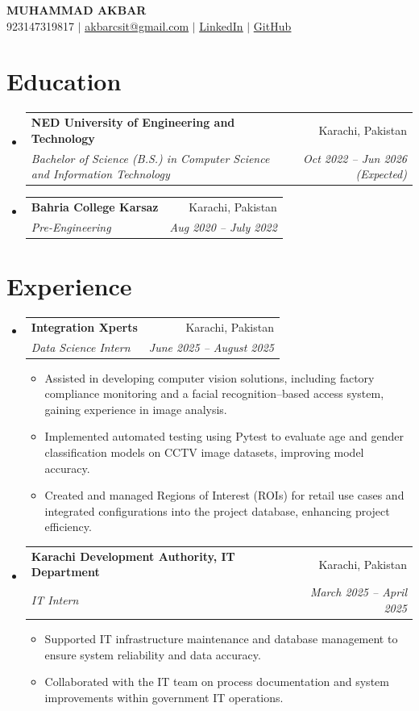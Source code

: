 \documentclass[letterpaper,11pt]{article}
\makeatletter
\newcommand{\resumeItem}[1]{
  \item\small{
    {#1 \vspace{-2pt}}
  }
}
\newcommand{\resumeSubheading}[4]{
  \vspace{-2pt}\item
    \begin{tabular*}{0.97\textwidth}[t]{l@{\extracolsep{\fill}}r}
      \textbf{#1} & #2 \\
      \textit{\small#3} & \textit{\small #4} \\
    \end{tabular*}\vspace{-7pt}
}
\newcommand{\resumeSubHeadingListStart}{\begin{itemize}[leftmargin=0.15in, label={}]}
\newcommand{\resumeSubHeadingListEnd}{\end{itemize}}
\newcommand{\resumeItemListStart}{\begin{itemize}}
\newcommand{\resumeItemListEnd}{\end{itemize}\vspace{-5pt}}
\makeatother
\begin{document}
\begin{center}
    \textbf{\Huge \scshape MUHAMMAD AKBAR} \\ \vspace{1pt}
    \small 923147319817 $|$ \href{mailto:akbarcsit@gmail.com}{\underline{akbarcsit@gmail.com}} $|$ 
    \href{https://www.linkedin.com/in/muhammad-akbar-0b7767270}{\underline{LinkedIn}} $|$
    \href{https://github.com/muakbar04}{\underline{GitHub}}
\end{center}


\section{Education}
  \resumeSubHeadingListStart
        \resumeSubheading
      {NED University of Engineering and Technology}{Karachi, Pakistan}
      {Bachelor of Science (B.S.) in Computer Science and Information Technology}{Oct 2022 – Jun 2026 (Expected)}
        \resumeSubheading
      {Bahria College Karsaz}{Karachi, Pakistan}
      {Pre-Engineering}{Aug 2020 – July 2022}
      \resumeSubHeadingListEnd


\section{Experience}
  \resumeSubHeadingListStart
        \resumeSubheading
      {Integration Xperts}{Karachi, Pakistan}
      {Data Science Intern}{June 2025 – August 2025}
      \resumeItemListStart
                \resumeItem{Assisted in developing computer vision solutions, including factory compliance monitoring and a facial recognition–based access system, gaining experience in image analysis.}
                \resumeItem{Implemented automated testing using Pytest to evaluate age and gender classification models on CCTV image datasets, improving model accuracy.}
                \resumeItem{Created and managed Regions of Interest (ROIs) for retail use cases and integrated configurations into the project database, enhancing project efficiency.}
              \resumeItemListEnd
        \resumeSubheading
      {Karachi Development Authority, IT Department}{Karachi, Pakistan}
      {IT Intern}{March 2025 – April 2025}
      \resumeItemListStart
                \resumeItem{Supported IT infrastructure maintenance and database management to ensure system reliability and data accuracy.}
                \resumeItem{Collaborated with the IT team on process documentation and system improvements within government IT operations.}
              \resumeItemListEnd
      \resumeSubHeadingListEnd
\end{document}
